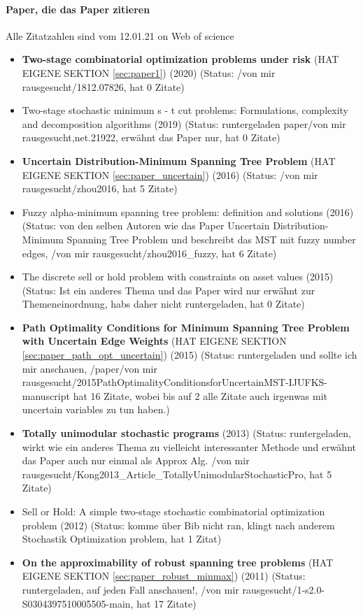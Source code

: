 \documentclass[paper=a4,10pt]{scrartcl}
\begin{document}
\paragraph{Paper, die das Paper zitieren}
Alle Zitatzahlen sind vom 12.01.21 on Web of science
\begin{itemize}
\item \textbf{Two-stage combinatorial optimization problems under risk} (HAT EIGENE SEKTION \ref{sec:paper1}) (2020) (Status: /von mir rausgesucht/1812.07826, hat 0 Zitate)
\item Two-stage stochastic minimum s - t cut problems: Formulations, complexity and decomposition algorithms (2019) (Status: runtergeladen paper/von mir rausgesucht,net.21922, erwähnt das Paper nur, hat 0 Zitate)
\item  \textbf{Uncertain Distribution-Minimum Spanning Tree Problem} (HAT EIGENE SEKTION \ref{sec:paper_uncertain}) (2016) (Status: /von mir rausgesucht/zhou2016, hat 5 Zitate)
\item  Fuzzy alpha-minimum spanning tree problem: definition and solutions (2016) (Status: von den selben Autoren wie das Paper Uncertain Distribution-Minimum Spanning Tree Problem und beschreibt das MST mit fuzzy number edges, /von mir rausgesucht/zhou2016\_fuzzy, hat 6 Zitate)
\item  The discrete sell or hold problem with constraints on asset values (2015) (Status: Ist ein anderes Thema und das Paper wird nur erwähnt zur Themeneinordnung, habs daher nicht runtergeladen, hat 0 Zitate)
\item  \textbf{Path Optimality Conditions for Minimum Spanning Tree Problem with Uncertain Edge Weights} (HAT EIGENE SEKTION \ref{sec:paper_path_opt_uncertain}) (2015) (Status: runtergeladen und sollte ich mir anschauen, /paper/von mir rausgesucht/2015PathOptimalityConditionsforUncertainMST-IJUFKS-manuscript hat 16 Zitate, wobei bis auf 2 alle Zitate auch irgenwas mit uncertain variables zu tun haben.)
\item  \textbf{Totally unimodular stochastic programs} (2013) (Status: runtergeladen, wirkt wie ein anderes Thema zu vielleicht interessanter Methode und erwähnt das Paper auch nur einmal als Approx Alg. /von mir rausgesucht/Kong2013\_Article\_TotallyUnimodularStochasticPro, hat 5 Zitate) 
\item  Sell or Hold: A simple two-stage stochastic combinatorial optimization problem (2012) (Status: komme über Bib nicht ran, klingt nach anderem Stochastik Optimization problem, hat 1 Zitat)
\item  \textbf{On the approximability of robust spanning tree problems} (HAT EIGENE SEKTION \ref{sec:paper_robust_minmax}) (2011) (Status: runtergeladen, auf jeden Fall anschauen!, /von mir rausgesucht/1-s2.0-S0304397510005505-main, hat 17 Zitate) 

\end{itemize}
\end{document}
